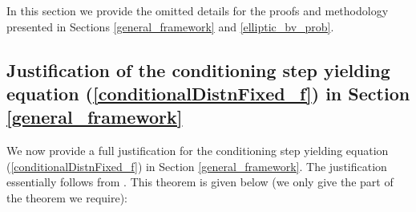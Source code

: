 In this section we provide the omitted details for the proofs and methodology presented in Sections \textcolor{blue}{\ref{general_framework}} and \textcolor{blue}{\ref{elliptic_bv_prob}}.

\subsection{Justification of the conditioning step yielding equation (\ref{conditionalDistnFixed_f}) in Section \textcolor{blue}{\ref{general_framework}}}

We now provide a full justification for the conditioning step yielding equation (\ref{conditionalDistnFixed_f}) in Section \textcolor{blue}{\ref{general_framework}}. The justification essentially follows from \textcolor{blue}{\citep[Theorem 3.3]{owhadi2015conditioning}}. This theorem is given below (we only give the part of the theorem we require): \vspace{5pt}

